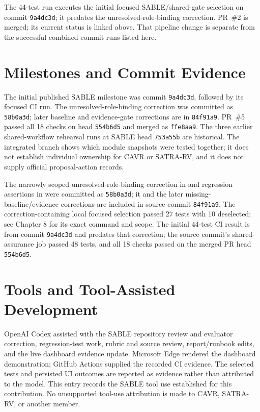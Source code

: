 The 44-test run executes the initial focused SABLE/shared-gate selection on commit \texttt{9a4dc3d}; it predates the unresolved-role-binding correction. PR~\#2 is merged; its current status is linked above. That pipeline change is separate from the successful combined-commit runs listed here.

\section{Milestones and Commit Evidence}

The initial published SABLE milestone was commit \texttt{9a4dc3d}, followed by its focused CI run. The unresolved-role-binding correction was committed as \texttt{58b0a3d}; later baseline and evidence-gate corrections are in \texttt{84f91a9}. PR~\#5 passed all 18 checks on head \texttt{554b6d5} and merged as \texttt{ffe8aa9}. The three earlier shared-workflow rehearsal runs at SABLE head \texttt{753a55b} are historical. The integrated branch shows which module snapshots were tested together; it does not establish individual ownership for CAVR or SATRA-RV, and it does not supply official proposal-action records.

\begin{sloppypar}
The narrowly scoped unresolved-role-binding correction in  and regression assertions in  were committed as \texttt{58b0a3d}; it and the later missing-baseline/evidence corrections are included in source commit \texttt{84f91a9}. The correction-containing local focused selection passed 27 tests with 10 deselected; see Chapter 8 for its exact command and scope. The initial 44-test CI result is from commit \texttt{9a4dc3d} and predates that correction; the source commit's shared-assurance job passed 48 tests, and all 18 checks passed on the merged PR head \texttt{554b6d5}.
\end{sloppypar}

\section{Tools and Tool-Assisted Development}

OpenAI Codex assisted with the SABLE repository review and evaluator correction, regression-test work, rubric and source review, report/runbook edits, and the live dashboard evidence update. Microsoft Edge rendered the dashboard demonstration; GitHub Actions supplied the recorded CI evidence. The selected tests and persisted UI outcomes are reported as evidence rather than attributed to the model. This entry records the SABLE tool use established for this contribution. No unsupported tool-use attribution is made to CAVR, SATRA-RV, or another member.

